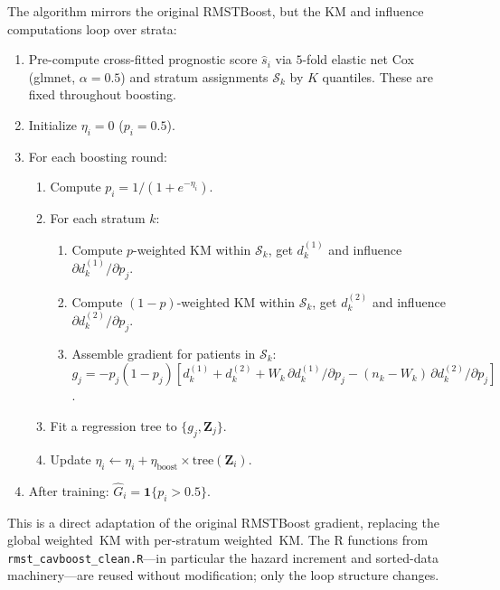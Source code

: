\documentclass[11pt,letterpaper]{article}
\newcommand{\ind}[1]{\mathbf{1}\{#1\}}
\begin{document}
The algorithm mirrors the original RMSTBoost, but the KM and influence
computations loop over strata:
\begin{enumerate}
  \item Pre-compute cross-fitted prognostic score $\widehat{s}_i$ via
        $5$-fold elastic net Cox (glmnet, $\alpha=0.5$) and stratum
        assignments $\mathcal{S}_k$ by $K$ quantiles.  These are fixed
        throughout boosting.
  \item Initialize $\eta_i = 0$ ($p_i = 0.5$).
  \item For each boosting round:
        \begin{enumerate}
          \item Compute $p_i = 1/(1+e^{-\eta_i})$.
          \item For each stratum $k$:
            \begin{enumerate}
              \item Compute $p$-weighted KM within $\mathcal{S}_k$,
                    get $d_k^{(1)}$ and influence $\partial d_k^{(1)}/\partial p_j$.
              \item Compute $(1-p)$-weighted KM within $\mathcal{S}_k$,
                    get $d_k^{(2)}$ and influence $\partial d_k^{(2)}/\partial p_j$.
              \item Assemble gradient for patients in $\mathcal{S}_k$:
                    $g_j = -p_j(1-p_j)[d_k^{(1)} + d_k^{(2)}
                    + W_k\,\partial d_k^{(1)}/\partial p_j
                    - (n_k-W_k)\,\partial d_k^{(2)}/\partial p_j]$.
            \end{enumerate}
          \item Fit a regression tree to $\{g_j, \bm{Z}_j\}$.
          \item Update $\eta_i \leftarrow \eta_i + \eta_{\text{boost}}
                \times \text{tree}(\bm{Z}_i)$.
        \end{enumerate}
  \item After training: $\widehat G_i = \ind{p_i > 0.5}$.
\end{enumerate}

This is a direct adaptation of the original RMSTBoost gradient, replacing
the global weighted~KM with per-stratum weighted~KM.  The R functions
from \texttt{rmst\_cavboost\_clean.R}---in particular the hazard
increment and sorted-data machinery---are reused without modification;
only the loop structure changes.
\end{document}
